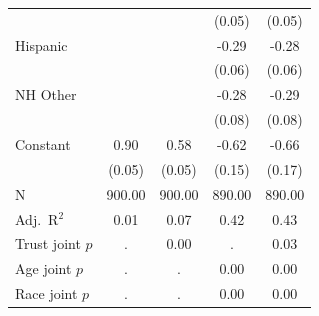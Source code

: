 {\begin{tabular*}{\linewidth}{@{\hskip\tabcolsep\extracolsep\fill}l*{4}{c}}
                    &                     &                     &      (0.05)         &      (0.05)         \\
Hispanic            &                     &                     &       -0.29\sym{***}&       -0.28\sym{***}\\
                    &                     &                     &      (0.06)         &      (0.06)         \\
NH Other            &                     &                     &       -0.28\sym{***}&       -0.29\sym{***}\\
                    &                     &                     &      (0.08)         &      (0.08)         \\
Constant            &        0.90\sym{***}&        0.58\sym{***}&       -0.62\sym{***}&       -0.66\sym{***}\\
                    &      (0.05)         &      (0.05)         &      (0.15)         &      (0.17)         \\
\midrule
N                   &      900.00         &      900.00         &      890.00         &      890.00         \\
Adj.\ R$^2$         &        0.01         &        0.07         &        0.42         &        0.43         \\
Trust joint $p$     &           .         &        0.00         &           .         &        0.03         \\
Age joint $p$       &           .         &           .         &        0.00         &        0.00         \\
Race joint $p$      &           .         &           .         &        0.00         &        0.00         \\
\bottomrule
\end{tabular*}
}
